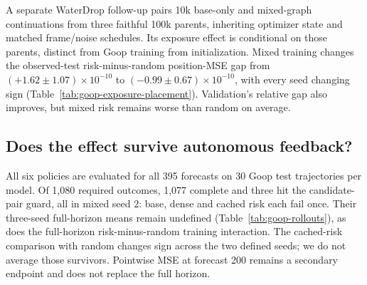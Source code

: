 A separate WaterDrop follow-up pairs 10k base-only and mixed-graph continuations from three faithful 100k parents, inheriting optimizer state and matched frame/noise schedules. Its exposure effect is conditional on those parents, distinct from Goop training from initialization. Mixed training changes the observed-test risk-minus-random position-MSE gap from $(+1.62\pm1.07)\times10^{-10}$ to $(-0.99\pm0.67)\times10^{-10}$, with every seed changing sign (Table~\ref{tab:goop-exposure-placement}). Validation's relative gap also improves, but mixed risk remains worse than random on average.

\subsection{Does the effect survive autonomous feedback?}
All six policies are evaluated for all 395 forecasts on 30 Goop test trajectories per model. Of 1,080 required outcomes, 1,077 complete and three hit the candidate-pair guard, all in mixed seed 2: base, dense and cached risk each fail once. Their three-seed full-horizon means remain undefined (Table~\ref{tab:goop-rollouts}), as does the full-horizon risk-minus-random training interaction. The cached-risk comparison with random changes sign across the two defined seeds; we do not average those survivors. Pointwise MSE at forecast 200 remains a secondary endpoint and does not replace the full horizon.

